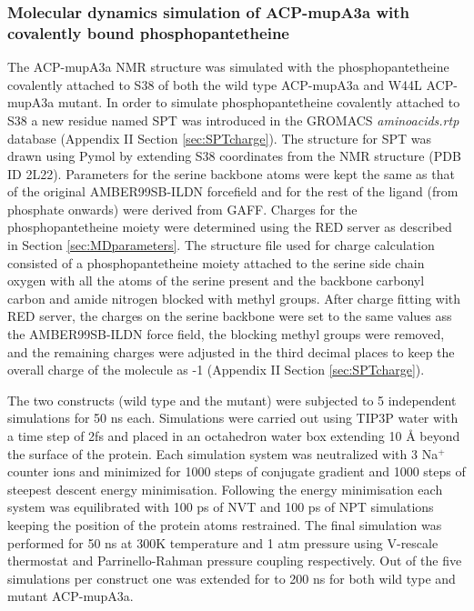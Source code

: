 			\subsubsection{Molecular dynamics simulation of ACP-mupA3a with covalently bound phosphopantetheine}
			\label{sec:SPTsimulation}
			The ACP-mupA3a NMR structure was simulated with the phosphopantetheine covalently attached to S38 of both the wild type ACP-mupA3a and W44L ACP-mupA3a mutant. In order to simulate phosphopantetheine covalently attached to S38 a new residue named SPT was introduced in the GROMACS \textit{aminoacids.rtp} database (Appendix II Section \ref{sec:SPTcharge}). The structure for SPT was drawn using Pymol by extending S38 coordinates from the NMR structure (PDB ID 2L22). Parameters for the serine backbone atoms were kept the same as that of the original AMBER99SB-ILDN forcefield and for the rest of the ligand (from phosphate onwards) were derived from GAFF. Charges for the phosphopantetheine moiety were determined  using  the RED server as described in Section \ref{sec:MDparameters}. The structure file used for charge calculation consisted of a phosphopantetheine moiety attached to the serine side chain oxygen with all the atoms of the serine present and the backbone carbonyl carbon and amide nitrogen blocked with methyl groups. After charge fitting with RED server, the charges on the serine backbone were set to the same values ass the AMBER99SB-ILDN force field, the blocking methyl groups were removed, and the remaining charges were adjusted in the third decimal places to keep the overall charge of the molecule as -1 %
			(Appendix II Section \ref{sec:SPTcharge}).
			
			The two constructs (wild type and the mutant) were subjected to 5 independent simulations for 50 ns each. Simulations were carried out using TIP3P water with a time step of 2fs and placed in an octahedron water box extending 10 {\AA }  beyond the surface of the protein. Each simulation system was neutralized with 3 Na$ ^{+} $ counter ions and minimized for 1000 steps of conjugate gradient and 1000 steps of steepest descent energy minimisation. Following the energy minimisation each system was equilibrated with 100 ps of NVT and 100 ps of NPT simulations keeping the position of the protein atoms restrained. The final simulation was performed for 50 ns at 300K temperature and 1 atm pressure using V-rescale thermostat \parencite{Berendsen1984} and Parrinello-Rahman pressure coupling \parencite{Parrinello1980} respectively. Out of the five simulations per construct one was extended for to 200 ns for both wild type and mutant ACP-mupA3a.
			
